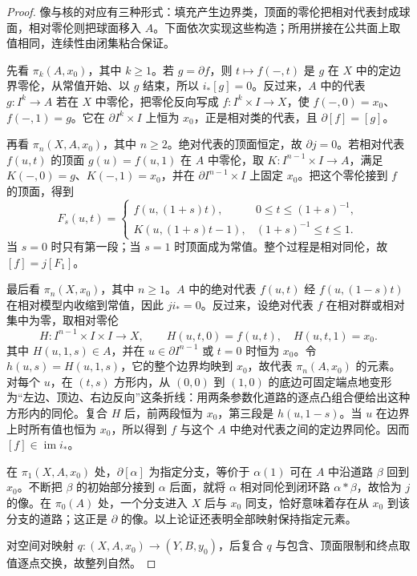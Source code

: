 \begin{proof}
	像与核的对应有三种形式：填充产生边界类，顶面的零伦把相对代表封成球面，相对零伦则把球面移入 \(A\)。下面依次实现这些构造；所用拼接在公共面上取值相同，连续性由闭集粘合保证。

	先看 \(\pi_k(A,x_0)\)，其中 \(k\ge1\)。若 \(g=\partial f\)，则 \(t\mapsto f(-,t)\) 是 \(g\) 在 \(X\) 中的定边界零伦，从常值开始、以 \(g\) 结束，所以 \(i_*[g]=0\)。反过来，\(A\) 中的代表 \(g:I^k\to A\) 若在 \(X\) 中零伦，把零伦反向写成 \(f:I^k\times I\to X\)，使 \(f(-,0)=x_0\)、\(f(-,1)=g\)。它在 \(\partial I^k\times I\) 上恒为 \(x_0\)，正是相对类的代表，且 \(\partial[f]=[g]\)。

	再看 \(\pi_n(X,A,x_0)\)，其中 \(n\ge2\)。绝对代表的顶面恒定，故 \(\partial j=0\)。若相对代表 \(f(u,t)\) 的顶面 \(g(u)=f(u,1)\) 在 \(A\) 中零伦，取 \(K:I^{n-1}\times I\to A\)，满足 \(K(-,0)=g\)、\(K(-,1)=x_0\)，并在 \(\partial I^{n-1}\times I\) 上固定 \(x_0\)。把这个零伦接到 \(f\) 的顶面，得到
	\[
		F_s(u,t)=
		\begin{cases}
			f(u,(1+s)t),&0\le t\le(1+s)^{-1},\\
			K(u,(1+s)t-1),&(1+s)^{-1}\le t\le1.
		\end{cases}
	\]
	当 \(s=0\) 时只有第一段；当 \(s=1\) 时顶面成为常值。整个过程是相对同伦，故 \([f]=j[F_1]\)。

	最后看 \(\pi_n(X,x_0)\)，其中 \(n\ge1\)。\(A\) 中的绝对代表 \(f(u,t)\) 经 \(f(u,(1-s)t)\) 在相对模型内收缩到常值，因此 \(j i_*=0\)。反过来，设绝对代表 \(f\) 在相对群或相对集中为零，取相对零伦
	\[
		H:I^{n-1}\times I\times I\longrightarrow X,
		\qquad H(u,t,0)=f(u,t),\quad H(u,t,1)=x_0.
	\]
	其中 \(H(u,1,s)\in A\)，并在 \(u\in\partial I^{n-1}\) 或 \(t=0\) 时恒为 \(x_0\)。令 \(h(u,s)=H(u,1,s)\)，它的整个边界均映到 \(x_0\)，故代表 \(\pi_n(A,x_0)\) 的元素。对每个 \(u\)，在 \((t,s)\) 方形内，从 \((0,0)\) 到 \((1,0)\) 的底边可固定端点地变形为“左边、顶边、右边反向”这条折线：用两条参数化道路的逐点凸组合便给出这种方形内的同伦。复合 \(H\) 后，前两段恒为 \(x_0\)，第三段是 \(h(u,1-s)\)。当 \(u\) 在边界上时所有值也恒为 \(x_0\)，所以得到 \(f\) 与这个 \(A\) 中绝对代表之间的定边界同伦。因而 \([f]\in\operatorname{im}i_*\)。

	在 \(\pi_1(X,A,x_0)\) 处，\(\partial[\alpha]\) 为指定分支，等价于 \(\alpha(1)\) 可在 \(A\) 中沿道路 \(\beta\) 回到 \(x_0\)。不断把 \(\beta\) 的初始部分接到 \(\alpha\) 后面，就将 \(\alpha\) 相对同伦到闭环路 \(\alpha*\beta\)，故恰为 \(j\) 的像。在 \(\pi_0(A)\) 处，一个分支进入 \(X\) 后与 \(x_0\) 同支，恰好意味着存在从 \(x_0\) 到该分支的道路；这正是 \(\partial\) 的像。以上论证还表明全部映射保持指定元素。

	对空间对映射 \(q:(X,A,x_0)\to(Y,B,y_0)\)，后复合 \(q\) 与包含、顶面限制和终点取值逐点交换，故整列自然。
\end{proof}

